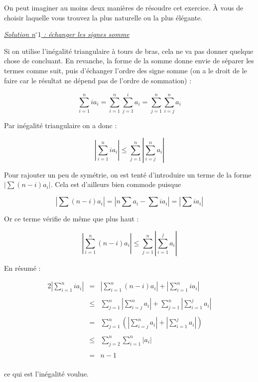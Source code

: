 \begin{sol}
On peut imaginer au moins deux manières de résoudre cet exercice. À vous de choisir laquelle vous trouvez la plus naturelle ou la plus élégante.

\underline{\textit{Solution n$^\circ 1$ : échanger les signes somme}}

Si on utilise l'inégalité triangulaire à tours de bras, cela ne va pas donner quelque chose de concluant. En revanche, la forme de la somme donne envie de séparer les termes comme suit, puis d'échanger l'ordre des signe somme (on a le droit de le faire car le résultat ne dépend pas de l'ordre de sommation) :

\[
\sum_{i=1}^{n} ia_i = \sum_{i=1}^n \sum_{j=1}^i a_i = \sum_{j=1}^n \sum_{i=j}^n a_i
\]

Par inégalité triangulaire on a donc :

\[\left| \sum_{i=1}^{n} ia_i \right| \leqslant \sum_{j=1}^n \left|\sum_{i=j}^n a_i\right|\]

Pour rajouter un peu de symétrie, on est tenté d'introduire un terme de la forme $|\sum (n-i)a_i|$. Cela est d'ailleurs bien commode puisque

\[|\sum (n-i)a_i| = |n\sum a_i - \sum ia_i| = |\sum ia_i|\]

Or ce terme vérifie de même que plus haut :

\[\left|\sum_{i=1}^n (n-i)a_i\right| \leqslant \sum_{j=1}^n \left|\sum_{i=1}^j a_i \right|\]

En résumé :

\[\begin{array}{lll}
\displaystyle 2 \left| \sum_{i=1}^{n} ia_i \right|
&=&\displaystyle \left| \sum_{i=1}^{n} (n-i)a_i \right|+\left| \sum_{i=1}^{n} ia_i \right| \\
&&\\
& \leqslant & \displaystyle\sum_{j=1}^n \left|\sum_{i=j}^n a_i\right| + \sum_{j=1}^n \left|\sum_{i=1}^j a_i \right| \\
&&\\
&=& \displaystyle\sum_{j=1}^n \left(\left|\sum_{i=j}^n a_i\right|+\left|\sum_{i=1}^j a_i \right|\right) \\
&&\\
&\leqslant & \displaystyle\sum_{j=2}^n \sum_{i=1}^n |a_i|\\
&&\\
&=&n-1\\
\end{array}\]

ce qui est l'inégalité voulue.


\end{sol}
